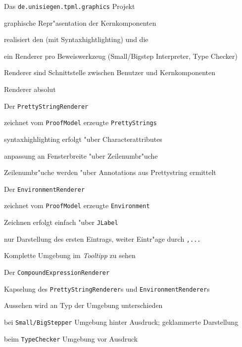 
 {

  \begin{itemgroup}{Das {\tt de.unisiegen.tpml.graphics} Projekt}
    \item graphische Repr"asentation der Kernkomponenten
    \item realisiert den  (mit Syntaxhightlighting) und die 
    \item ein Renderer pro Beweiswerkzeug (Small/Bigstep Interpreter, Type Checker)
    \item Renderer sind Schnittstelle zwischen Benutzer und Kernkomponenten
    \item Renderer absolut 
  \end{itemgroup}
}



 {

  \begin{itemgroup} {Der {\tt PrettyStringRenderer} }
    \item zeichnet vom {\tt ProofModel} erzeugte {\tt PrettyStrings}
    \item syntaxhighlighting erfolgt "uber Characterattributes
    \item anpassung an Fensterbreite "uber Zeilenumbr"uche
    \item Zeilenumbr"uche werden "uber Annotations aus Prettystring ermittelt
  \end{itemgroup}
}

 {
  \begin{itemgroup} {Der {\tt EnvironmentRenderer} }
    \item zeichnet vom {\tt ProofModel} erzeugte {\tt Environment}
    \item Zeichnen erfolgt einfach "uber {\tt JLabel}
    \item nur Darstellung des ersten Eintrags, weiter Eintr"age durch {\tt ,...}
    \item Komplette Umgebung im {\it Tooltipp} zu sehen
  \end{itemgroup}
}

 {
  \begin{itemgroup} {Der {\tt CompoundExpressionRenderer} }
    \item Kapselung des {\tt PrettyStringRenderer}s und {\tt EnvironmentRenderer}s
    \item Aussehen wird an Typ der Umgebung unterschieden 
    \begin {itemgroup} {}
      \item bei {\tt Small/BigStepper} Umgebung hinter Ausdruck; geklammerte Darstellung
      \item beim {\tt TypeChecker} Umgebung vor Ausdruck
    \end{itemgroup}
  \end{itemgroup}

}

